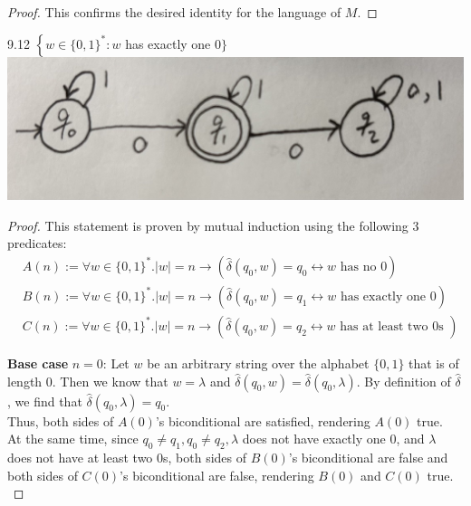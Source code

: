 \documentclass[10pt]{article}
\begin{document}
\begin{enumerate}[label={}]
\begin{proof}
                  This confirms the desired identity for the language of $M$.

            \end{proof}

            \newpage

            9.12 $\left\{w \in\{0,1\}^*: w\right.$ has exactly one 0$\}$\\
            \includegraphics[scale=0.1]{9.12}
            \begin{proof}
                  This statement is proven by mutual induction using the following 3 predicates:\\
                  $$
                        \begin{aligned}
                               & A(n):=\forall w \in\{0,1\}^* .|w|=n \rightarrow\left(\hat{\delta}\left(q_0, w\right)=q_0 \leftrightarrow w \text { has no } 0\right)            \\
                               & B(n):=\forall w \in\{0,1\}^* .|w|=n \rightarrow\left(\hat{\delta}\left(q_0, w\right)=q_1 \leftrightarrow w \text { has exactly one } 0\right)   \\
                               & C(n):=\forall w \in\{0,1\}^* .|w|=n \rightarrow\left(\hat{\delta}\left(q_0, w\right)=q_2 \leftrightarrow w \text { has at least two 0s }\right)
                        \end{aligned}
                  $$

                  \textbf{Base case} $n=0$: Let $w$ be an arbitrary string over the alphabet $\{0,1\}$ that is of length 0. Then we know that $w=\lambda$ and $\hat{\delta}\left(q_0, w\right)=\hat{\delta}\left(q_0, \lambda\right)$. By definition of $\hat{\delta}$, we find that $\hat{\delta}\left(q_0, \lambda\right)=q_0$.\\
                  Thus, both sides of $A(0)$'s biconditional are satisfied, rendering $A(0)$ true.\\
                  At the same time, since $q_0 \neq q_1, q_0 \neq q_2, \lambda$ does not have exactly one 0, and $\lambda$ does not have at least two 0s, both sides of $B(0)$'s biconditional are false and both sides of $C(0)$'s biconditional are false, rendering $B(0)$ and $C(0)$ true.\\


\end{proof}
\end{enumerate}
\end{document}
